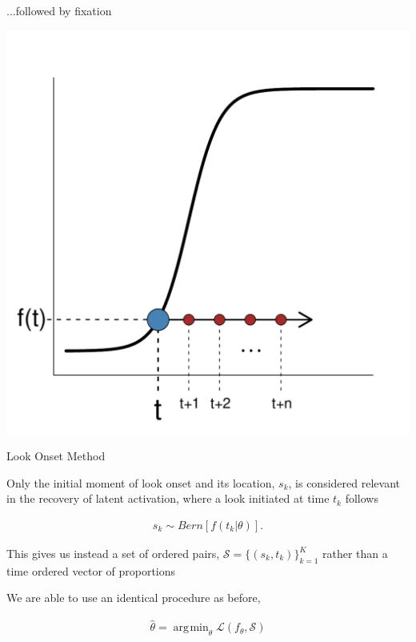 \documentclass{beamer}
\DeclareMathOperator*{\argmin}{arg\!\min}
\newcommand{\vp}{\vspace{2mm}}
\providecommand{\cn}[1]{\textcolor{blue}{#1}}
\begin{document}
\begin{frame}{...followed by fixation}
\vspace{-5mm}
\begin{center}
\includegraphics[scale=0.4]{img/logistic_c.pdf}
\end{center}
\end{frame}

\begin{frame}{Look Onset Method}


Only the initial moment of look onset and its location, $s_k$, is considered relevant in the recovery of latent activation, where a look initiated at time $t_k$ follows
\vspace{-2mm}

\begin{align*}
s_k \sim Bern \left[f(t_k | \theta)\right].
\end{align*}

This gives us instead a set of ordered pairs, $\mathcal{S} = \{(s_k, t_k)\}_{k=1}^K$ rather than a time ordered vector of proportions  \vspace{4mm}

We are able to use an identical procedure as before, 

\begin{align*}
\hat{\theta} = \argmin_{\theta} \mathcal{L}(f_{\theta}, \mathcal{S})
\end{align*}

\end{frame}
\end{document}
